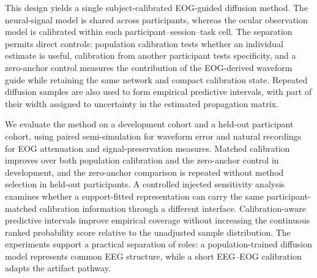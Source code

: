 This design yields a single subject-calibrated EOG-guided diffusion method. The neural-signal model is shared across participants, whereas the ocular observation model is calibrated within each participant--session--task cell. The separation permits direct controls: population calibration tests whether an individual estimate is useful, calibration from another participant tests specificity, and a zero-anchor control measures the contribution of the EOG-derived waveform guide while retaining the same network and compact calibration state. Repeated diffusion samples are also used to form empirical predictive intervals, with part of their width assigned to uncertainty in the estimated propagation matrix.

We evaluate the method on a development cohort and a held-out participant cohort, using paired semi-simulation for waveform error and natural recordings for EOG attenuation and signal-preservation measures. Matched calibration improves over both population calibration and the zero-anchor control in development, and the zero-anchor comparison is repeated without method selection in held-out participants. A controlled injected sensitivity analysis examines whether a support-fitted representation can carry the same participant-matched calibration information through a different interface. Calibration-aware predictive intervals improve empirical coverage without increasing the continuous ranked probability score relative to the unadjusted sample distribution. The experiments support a practical separation of roles: a population-trained diffusion model represents common EEG structure, while a short EEG--EOG calibration adapts the artifact pathway.
